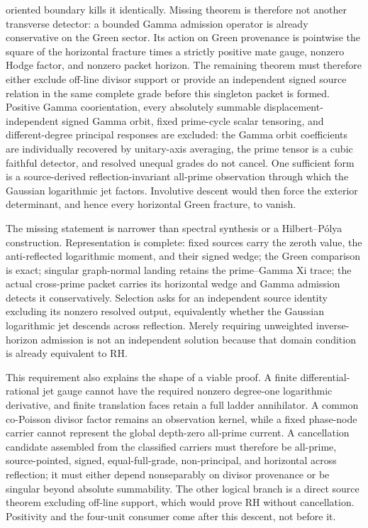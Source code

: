 \documentclass[11pt]{article}
\theoremstyle{definition}
\theoremstyle{remark}
\begin{document}
\begin{enumerate}[leftmargin=2.2em]
      oriented boundary kills it identically.  Missing theorem is therefore
      not another transverse detector: a bounded Gamma admission operator is
      already conservative on the Green sector.  Its action on Green
      provenance is pointwise the square of the horizontal fracture times a
      strictly positive mate gauge, nonzero Hodge factor, and nonzero packet
      horizon.  The remaining theorem must therefore either exclude off-line
      divisor support or provide an independent signed source relation in the
      same complete grade before this singleton packet is formed.  Positive
      Gamma coorientation, every absolutely summable
      displacement-independent signed Gamma orbit, fixed prime-cycle scalar
      tensoring, and different-degree principal responses are excluded: the
      Gamma orbit coefficients are individually recovered by unitary-axis
      averaging, the prime tensor is a cubic faithful detector,
      and resolved unequal grades do not cancel.  One sufficient form
      is a source-derived reflection-invariant all-prime observation through
      which the Gaussian logarithmic jet factors.  Involutive descent would
      then force the exterior determinant, and hence every horizontal Green
      fracture, to vanish.
\end{enumerate}

The missing statement is narrower than spectral synthesis or a
Hilbert--P\'olya construction.  Representation is complete: fixed sources
carry the zeroth value, the anti-reflected logarithmic moment, and their
signed wedge; the Green comparison is exact; singular graph-normal landing
retains the prime--Gamma Xi trace; the actual cross-prime packet carries its
horizontal wedge and Gamma admission detects it conservatively.  Selection
asks for an independent source identity excluding its nonzero resolved
output, equivalently whether the Gaussian
logarithmic jet descends across reflection.  Merely requiring unweighted
inverse-horizon admission is not an independent solution because that domain
condition is already equivalent to RH.

This requirement also explains the shape of a viable proof.  A finite
differential-rational jet gauge cannot have the required nonzero degree-one
logarithmic derivative, and finite translation faces retain a full ladder
annihilator.  A common co-Poisson divisor factor remains an observation
kernel, while a fixed phase-node carrier cannot represent the global
depth-zero all-prime current.  A cancellation candidate assembled from the
classified carriers must therefore be all-prime, source-pointed, signed,
equal-full-grade, non-principal, and horizontal across reflection; it must
either depend nonseparably on divisor provenance or be singular beyond
absolute summability.
The other logical branch is a direct source theorem excluding off-line
support, which would prove RH without cancellation.
Positivity and the four-unit consumer come after this descent, not before it.
\end{document}
